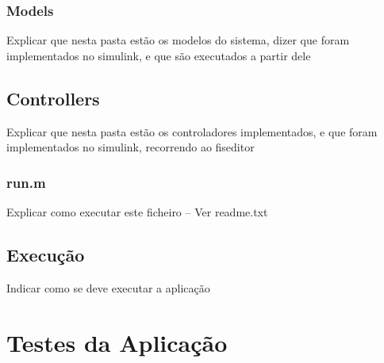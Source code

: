 \documentclass{article}
\begin{document}
\subsubsection{Models}

Explicar que nesta pasta estão os modelos do sistema, dizer que foram implementados no simulink, e que são executados a partir dele

\subsection{Controllers}

Explicar que nesta pasta estão os controladores implementados, e que foram implementados no simulink, recorrendo ao fiseditor

\subsubsection{run.m}

Explicar como executar este ficheiro -- Ver readme.txt


\subsection{Execução}

Indicar como se deve executar a aplicação


\pagebreak

\section{Testes da Aplicação}



\end{document}
